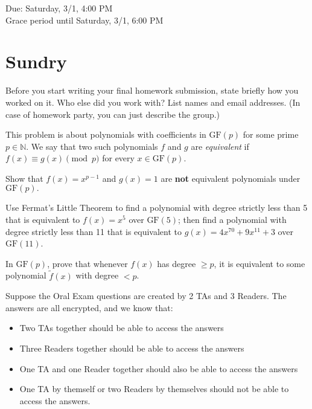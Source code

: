 \documentclass[11pt]{article}
\begin{document}
\maketitle
\fontsize{12}{15}\selectfont

\begin{center}
    Due: Saturday, 3/1, 4:00 PM \\
    Grace period until Saturday, 3/1, 6:00 PM \\
\end{center}

\section*{Sundry}
Before you start writing your final homework submission, state briefly how you worked on it.  Who else did you work with?  List names and email addresses.  (In case of homework party, you can just describe the group.)

\vspace{15pt}


This problem is about polynomials with coefficients in $\text{GF}(p)$ for some prime $p \in \mathbb{N}$. We say that two such polynomials $f$ and $g$ are \emph{equivalent} if $f(x) \equiv g(x) \pmod{p}$ for every $x \in \text{GF}(p)$. 

\begin{Parts}
    \Part Show that $f(x)=x^{p-1}$ and $g(x)=1$ are \textbf{not} equivalent polynomials under $\text{GF}(p).$

    \Part Use Fermat's Little Theorem to find a polynomial with degree strictly less than 5 that is equivalent to $f(x) = x^5$ over $\text{GF}(5)$; then find a polynomial with degree strictly less than 11 that is equivalent to $g(x) = 4x^{70} + 9x^{11} + 3$ over $\text{GF}(11)$.

    \Part In $\mathrm{GF}(p)$, prove that whenever $f(x)$ has degree $\ge p$, it is equivalent to some polynomial $\tilde f(x)$ with degree $< p$.
\end{Parts}

Suppose the Oral Exam questions are created by 2 TAs and 3 Readers. The answers are all encrypted, and we know that:

\begin{itemize}
\item Two TAs together should be able to access the answers
\item Three Readers together should be able to access the answers
\item One TA and one Reader together should also be able to access the answers
\item One TA by themself or two Readers by themselves should not be able to access the answers.
\end{itemize}
\end{document}
